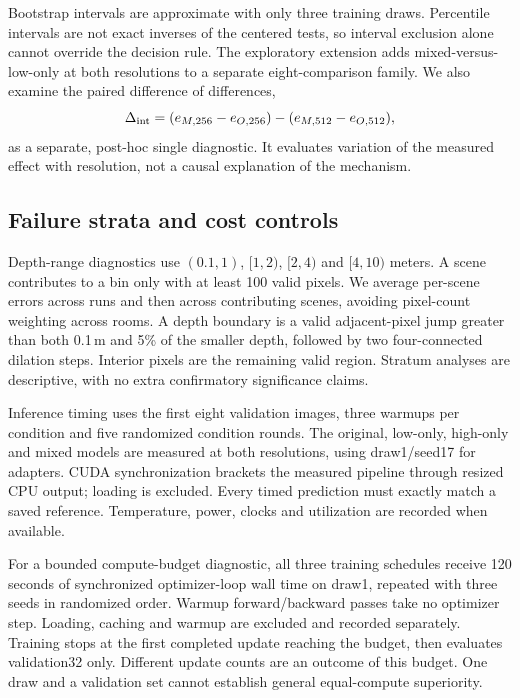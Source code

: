 Bootstrap intervals are approximate with only three training draws. Percentile intervals are not exact inverses of the centered tests, so interval exclusion alone cannot override the decision rule. The exploratory extension adds mixed-versus-low-only at both resolutions to a separate eight-comparison family. We also examine the paired difference of differences,
\begin{equation}
\Delta_{\rm int}=(e_{M,256}-e_{O,256})-(e_{M,512}-e_{O,512}),
\end{equation}
as a separate, post-hoc single diagnostic. It evaluates variation of the measured effect with resolution, not a causal explanation of the mechanism.

\subsection{Failure strata and cost controls}
Depth-range diagnostics use $(0.1,1)$, $[1,2)$, $[2,4)$ and $[4,10)$ meters. A scene contributes to a bin only with at least 100 valid pixels. We average per-scene errors across runs and then across contributing scenes, avoiding pixel-count weighting across rooms. A depth boundary is a valid adjacent-pixel jump greater than both 0.1\,m and 5\% of the smaller depth, followed by two four-connected dilation steps. Interior pixels are the remaining valid region. Stratum analyses are descriptive, with no extra confirmatory significance claims.

Inference timing uses the first eight validation images, three warmups per condition and five randomized condition rounds. The original, low-only, high-only and mixed models are measured at both resolutions, using draw1/seed17 for adapters. CUDA synchronization brackets the measured pipeline through resized CPU output; loading is excluded. Every timed prediction must exactly match a saved reference. Temperature, power, clocks and utilization are recorded when available.

For a bounded compute-budget diagnostic, all three training schedules receive 120 seconds of synchronized optimizer-loop wall time on draw1, repeated with three seeds in randomized order. Warmup forward/backward passes take no optimizer step. Loading, caching and warmup are excluded and recorded separately. Training stops at the first completed update reaching the budget, then evaluates validation32 only. Different update counts are an outcome of this budget. One draw and a validation set cannot establish general equal-compute superiority.

